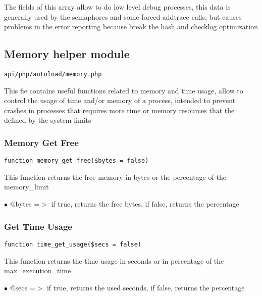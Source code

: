 \documentclass[a4paper]{article}
\begin{document}
The fields of this array allow to do low level debug processes, this data is
generally used by the semaphores and some forced addtrace calls, but causes
problems in the error reporting because break the hash and checklog optimization

\hypertarget{toc166}{}
\subsection{Memory helper module}

\begin{lstlisting}
api/php/autoload/memory.php
\end{lstlisting}

This fie contains useful functions related to memory and time usage, allow to control the usage
of time and/or memory of a process, intended to prevent crashes in processes that requires more
time or memory resources that the defined by the system limits

\hypertarget{toc167}{}
\subsubsection{Memory Get Free}

\begin{lstlisting}
function memory_get_free($bytes = false)
\end{lstlisting}

This function returns the free memory in bytes or the percentage of the memory\_limit

\begin{compactitem}
\item[\color{myblue}$\bullet$] @bytes =$>$ if true, returns the free bytes, if false, returns the percentage
\end{compactitem}

\hypertarget{toc168}{}
\subsubsection{Get Time Usage}

\begin{lstlisting}
function time_get_usage($secs = false)
\end{lstlisting}

This function returns the time usage in seconds or in percentage of the max\_execution\_time

\begin{compactitem}
\item[\color{myblue}$\bullet$] @secs =$>$ if true, returns the used seconds, if false, returns the percentage
\end{compactitem}
\end{document}
